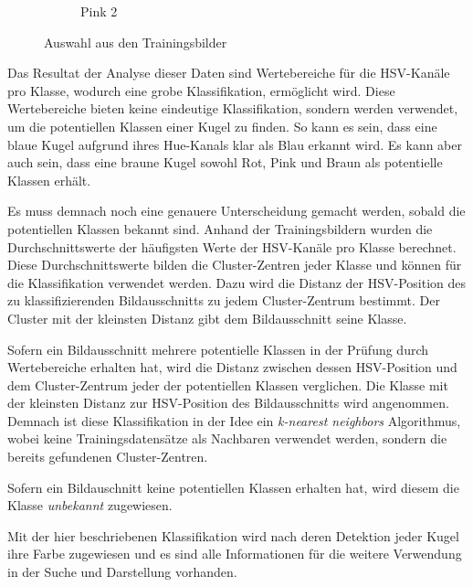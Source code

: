 \begin{figure}
\begin{subfigure}[b]{0.15\textwidth}
        \caption{Pink 2}
        \label{fig:classification_pink_ball_2}
    \end{subfigure}
    \caption{Auswahl aus den Trainingsbilder}
    \label{fig:classification_trainingdata_examples}
\end{figure}

Das Resultat der Analyse dieser Daten sind Wertebereiche für die HSV-Kanäle pro Klasse, wodurch eine grobe Klassifikation,
ermöglicht wird. Diese Wertebereiche bieten keine eindeutige Klassifikation, sondern werden verwendet, um die potentiellen
Klassen einer Kugel zu finden.
So kann es sein, dass eine blaue Kugel aufgrund ihres Hue-Kanals klar als Blau erkannt wird.
Es kann aber auch sein, dass eine braune Kugel sowohl Rot, Pink und Braun als potentielle Klassen erhält.

Es muss demnach noch eine genauere Unterscheidung gemacht werden, sobald die potentiellen Klassen bekannt sind.
Anhand der Trainingsbildern wurden die Durchschnittswerte der häufigsten Werte der HSV-Kanäle pro Klasse berechnet.
Diese Durchschnittswerte bilden die Cluster-Zentren jeder Klasse und können für die Klassifikation verwendet werden.
Dazu wird die Distanz der HSV-Position des zu klassifizierenden Bildausschnitts zu jedem Cluster-Zentrum bestimmt.
Der Cluster mit der kleinsten Distanz gibt dem Bildausschnitt seine Klasse.

Sofern ein Bildausschnitt mehrere potentielle Klassen in der Prüfung durch Wertebereiche erhalten hat, wird die Distanz
zwischen dessen HSV-Position und dem Cluster-Zentrum jeder der potentiellen Klassen verglichen.
Die Klasse mit der kleinsten Distanz zur HSV-Position des Bildausschnitts wird angenommen.
Demnach ist diese Klassifikation in der Idee ein \emph{k-nearest neighbors} Algorithmus\cite{wiki:k_nearest_neighbors},
wobei keine Trainingsdatensätze als Nachbaren verwendet werden, sondern die bereits gefundenen Cluster-Zentren.

Sofern ein Bildauschnitt keine potentiellen Klassen erhalten hat, wird diesem die Klasse \emph{unbekannt} zugewiesen.

Mit der hier beschriebenen Klassifikation wird nach deren Detektion jeder Kugel ihre Farbe zugewiesen und es
sind alle Informationen für die weitere Verwendung in der Suche und Darstellung vorhanden.
